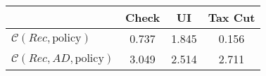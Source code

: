 \begin{tabular}{@{}lccc@{}} 
\toprule 
                          & Check      & UI    & Tax Cut    \\  \midrule 
$\mathcal{C}(Rec,\text{policy})$ & 0.737  & 1.845  & 0.156     \\ 
$\mathcal{C}(Rec, AD,\text{policy})$ & 3.049  & 2.514  & 2.711     \\ 
\end{tabular}  
